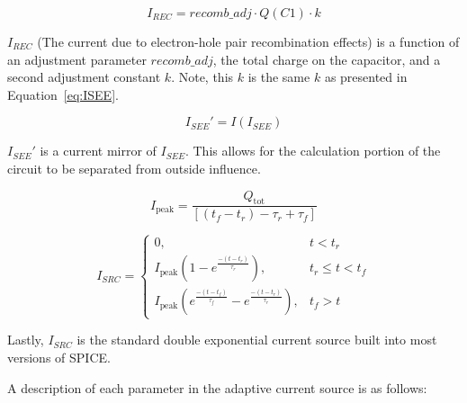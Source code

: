 \documentclass[conference]{IEEEtran}
\begin{document}
    \begin{equation}
        I_{REC} = recomb\_adj \cdot Q(C1) \cdot k\label{eq:IREC}
    \end{equation}

    \(I_{REC}\) (The current due to electron-hole pair recombination effects) is a function of an adjustment parameter \(recomb\_adj\), the total charge on the capacitor, and a second adjustment constant \(k\).
    Note, this \(k\) is the same \(k\) as presented in Equation~\ref{eq:ISEE}.

    \begin{equation}
        I_{SEE}' = I(I_{SEE})\label{eq:ISEE'}
    \end{equation}

    \(I_{SEE}'\) is a current mirror of \(I_{SEE}\).
    This allows for the calculation portion of the circuit to be separated from outside influence.

    \begin{equation}
        I_{\text{peak}} = \frac{Q_{\text{tot}}}{[(t_f - t_r) - \tau_r + \tau_f]}\label{eq:Ipeak}
    \end{equation}

    \begin{equation}
        I_{SRC} = \begin{cases}
                      0, & t < t_r \\
                      I_{\text{peak}}\left(1 - e^{\frac{-(t - t_r)}{\tau_r}}\right), & t_r \leq t < t_f \\
                      I_{\text{peak}}\left(e^{\frac{-(t - t_f)}{\tau_f}} - e^{\frac{-(t - t_r)}{\tau_r}}\right), & t_f > t
        \end{cases}\label{eq:ISRC}
    \end{equation}

    Lastly, \(I_{SRC}\) is the standard double exponential current source built into most versions of SPICE\@.

    A description of each parameter in the adaptive current source is as follows:
\end{document}
